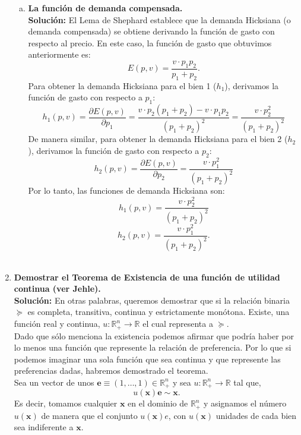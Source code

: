 \begin{enumerate}
\begin{enumerate}[a)]
	    \item \textbf{La función de demanda compensada.}\\

		\textbf{Solución:} El Lema de Shephard establece que la demanda Hicksiana (o demanda compensada) se obtiene derivando la función de gasto con respecto al precio. En este caso, la función de gasto que obtuvimos anteriormente es:
		$$E(p,v) = \frac{v \cdot p_1p_2}{p_1 + p_2}.$$
		Para obtener la demanda Hicksiana para el bien 1 ($h_1$), derivamos la función de gasto con respecto a $p_1$:
		$$h_1(p,v) = \frac{\partial E(p,v)}{\partial p_1} = \frac{v \cdot p_2(p_1 + p_2) - v \cdot p_1p_2}{(p_1 + p_2)^2} = \frac{v \cdot p_2^2}{(p_1 + p_2)^2}$$
		De manera similar, para obtener la demanda Hicksiana para el bien 2 ($h_2$), derivamos la función de gasto con respecto a $p_2$:
		$$h_2(p,v) = \frac{\partial E(p,v)}{\partial p_2} = \frac{v \cdot p_1^2}{(p_1 + p_2)^2}$$
		Por lo tanto, las funciones de demanda Hicksiana son:
		$$h_1(p,v) = \frac{v \cdot p_2^2}{(p_1 + p_2)^2}$$
		$$h_2(p,v) = \frac{v \cdot p_1^2}{(p_1 + p_2)^2}.$$\\

	\end{enumerate}

    \item \textbf{Demostrar el Teorema de Existencia de una función de utilidad continua (ver Jehle).}\\

	\textbf{Solución:} En otras palabras, queremos demostrar que si la relación binaria $\succeq$ es completa, transitiva, continua y estrictamente monótona. Existe, una función real y continua, $u:\mathbb{R}^n_+\to \mathbb{R}$ el cual representa a $\succeq$.\\

	Dado que sólo menciona la existencia podemos afirmar que podría haber por lo menos una función que represente la relación de preferencia. Por lo que si podemos imaginar una sola función que sea continua y que represente las preferencias dadas, habremos demostrado el teorema.\\

	Sea un vector de unos $\textbf{e}\equiv(1,\ldots,1)\in \mathbb{R}^n_+$ y sea $u:\mathbb{R}^n_+\to \mathbb{R}$ tal que,
	\begin{equation}
	    u(\textbf{x})\textbf{e}\sim \textbf{x}.
	\end{equation}
	Es decir, tomamos cualquier $\textbf{x}$ en el dominio de $\mathbb{R}^n_+$ y asignamos el número $u(\textbf{x})$ de manera que el conjunto $u(\textbf{x})e$, con $u(\textbf{x})$ unidades de cada bien sea indiferente a $\textbf{x}$.\\


\end{enumerate}
